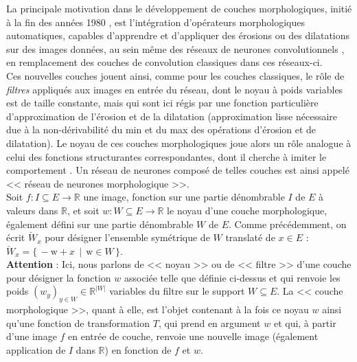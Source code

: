 La principale motivation dans le développement de couches morphologiques, initié à la fin des années 1980 \cite{Wilson_1989, Davidson_1990}, est l'intégration d'opérateurs morphologiques automatiques, capables d’apprendre et d’appliquer des érosions ou des dilatations sur des images données, au sein même des réseaux de neurones convolutionnels \cite{LeCun_2015}, en remplacement des couches de convolution classiques dans ces réseaux-ci. \\

\vspace{-1.4mm}
Ces nouvelles couches jouent ainsi, comme pour les couches classiques, le rôle de \textit{filtres} appliqués aux images en entrée du réseau, dont le noyau à poids variables est de taille constante, mais qui sont ici régis par une fonction particulière d'approximation de l'érosion et de la dilatation (approximation lisse nécessaire due à la non-dérivabilité du min et du max des opérations d'érosion et de dilatation). Le noyau de ces couches morphologiques joue alors un rôle analogue à celui des fonctions structurantes correspondantes, dont il cherche à imiter le comportement \cite{Bloch_2021}. Un réseau de neurones composé de telles couches est ainsi appelé << réseau de neurones morphologique >>. \\

\vspace{-1.4mm}
Soit $f: I \subseteq E \rightarrow \mathbb{R}$ une image, fonction sur une partie dénombrable $I$ de $E$ à valeurs dans $\mathbb{R}$, et soit $w: W \subseteq E \rightarrow \mathbb{R}$ le noyau d'une couche morphologique, également défini sur une partie dénombrable $W$ de $E$. Comme précédemment, on écrit $\breve{W}_x$ pour désigner l'ensemble symétrique de $W$ translaté de $x \in E$ :   $\breve{W}_x = \{ \, -\text{w} + x \, \mid \, \text{w} \in W \, \}$. \\

\vspace{-1.4mm}
\noindent \textbf{Attention} : Ici, nous parlons de << noyau >> ou de << filtre >> d'une couche pour désigner la fonction $w$ associée telle que définie ci-dessus et qui renvoie les poids $(w_y)_{y \in W} \in \mathbb{R}^{|W|}$ variables du filtre sur le support $W \subseteq E$. La << couche morphologique >>, quant à elle, est l'objet contenant à la fois ce noyau $w$ ainsi qu'une fonction de transformation $T$, qui prend en argument $w$ et qui, à partir d'une image $f$ en entrée de couche, renvoie une nouvelle image (également application de $I$ dans $\mathbb{R}$) en fonction de $f$ et $w$. \\



